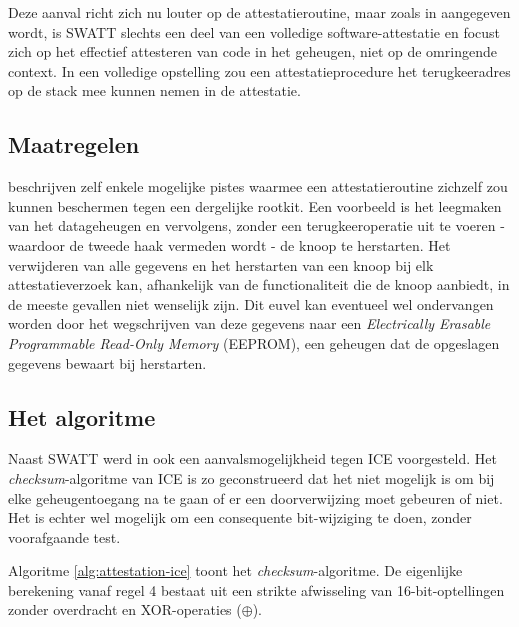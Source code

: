 Deze aanval richt zich nu louter op de attestatieroutine, maar zoals in
\citep{perrig2010refutation} aangegeven wordt, is SWATT slechts een deel van
een volledige software-attestatie en focust zich op het effectief attesteren
van code in het geheugen, niet op de omringende context. In een volledige
opstelling zou een attestatieprocedure het terugkeeradres op de stack mee
kunnen nemen in de attestatie.

\subsection{Maatregelen}

\citep{castelluccia2009difficulty} beschrijven zelf enkele mogelijke pistes
waarmee een attestatieroutine zichzelf zou kunnen beschermen tegen een
dergelijke rootkit. Een voorbeeld is het leegmaken van het datageheugen en
vervolgens, zonder een terugkeeroperatie uit te voeren - waardoor de tweede
haak vermeden wordt - de knoop te herstarten. Het verwijderen van alle gegevens
en het herstarten van een knoop bij elk attestatieverzoek kan, afhankelijk van
de functionaliteit die de knoop aanbiedt, in de meeste gevallen niet wenselijk
zijn. Dit euvel kan eventueel wel ondervangen worden door het wegschrijven van
deze gegevens naar een \emph{Electrically Erasable Programmable Read-Only
Memory} (EEPROM), een geheugen dat de opgeslagen gegevens bewaart bij
herstarten.

\subsection{Het algoritme}

Naast SWATT werd in \citep{castelluccia2009difficulty} ook een
aanvalsmogelijkheid tegen ICE voorgesteld. Het \emph{checksum}-algoritme van
ICE is zo geconstrueerd dat het niet mogelijk is om bij elke geheugentoegang na
te gaan of er een doorverwijzing moet gebeuren of niet. Het is echter wel
mogelijk om een consequente bit-wijziging te doen, zonder voorafgaande test.

Algoritme \ref{alg:attestation-ice} toont het \emph{checksum}-algoritme. De
eigenlijke berekening vanaf regel 4 bestaat uit een strikte afwisseling van
16-bit-optellingen zonder overdracht en XOR-operaties ($\oplus$).

